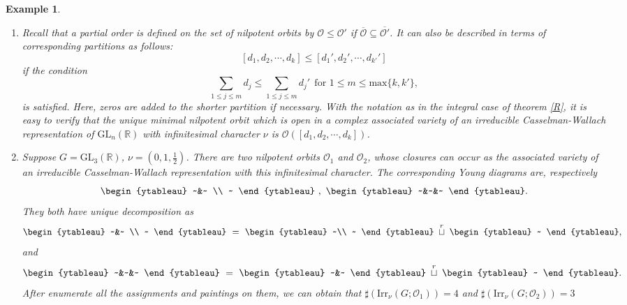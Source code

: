 \documentclass[12pt, a4paper]{amsart}
\numberwithin{equation}{section}
\newtheorem{examp}[thm]{Example}
\newcommand{\BR}{{\mathbb {R}}}
\newcommand{\CO}{{\mathcal {O}}}
\newcommand{\GL}{{\mathrm{GL}}}
\newcommand{\Irr}{{\mathrm{Irr}}}
\renewcommand{\bar}{\overline}
\begin{document}
\begin{examp}
    \begin{enumerate}
        \item Recall that a partial order is defined on the set of nilpotent orbits by $\CO \leq \CO'$ if $\bar{\CO} \subseteq \bar{\CO'}$. It can also be described in terms of corresponding partitions as follows: 
        \[
            [d_1, d_2, \cdots , d_k] \leq [d_1', d_2', \cdots , d_{k'}']
        \]
        if the condition
        \[
            \sum_{1 \leq j \leq m} d_{j} \leq \sum_{1 \leq j \leq m} d_{j}' \  \ \textrm{for $1 \leq m \leq \mathrm{max}\{k,k'\}$},
        \]
        is satisfied. Here, zeros are added to the shorter partition if necessary.
        With the notation as in the integral case of theorem \ref{R}, it is easy to verify that the unique minimal nilpotent orbit which is open in a complex associated variety of an irreducible Casselman-Wallach representation of $\GL_n(\BR)$ with infinitesimal character $\nu$ is $\CO([d_1, d_2, \cdots, d_k])$.
        \item Suppose $G = \GL_3(\BR)$, $\nu = (0,1,\frac{1}{2})$. There are two nilpotent orbits $\CO_1$ and $\CO_2$, whose closures can occur as the associated variety of an irreducible Casselman-Wallach representation with this infinitesimal character. The corresponding Young diagrams are, respectively
        \[
                \begin{ytableau}
                    ~&~ \\
                    ~
                \end{ytableau}
                ~,~
                \begin{ytableau}
                    ~&~&~
                \end{ytableau}.
        \]
        They both have unique decomposition as
        \[
        \begin{ytableau}
            ~&~ \\
            ~
        \end{ytableau}
        ~=~
        \begin{ytableau}
            ~\\
            ~
        \end{ytableau}
        ~\mathop{\sqcup}\limits^r~
        \begin{ytableau}
            ~
        \end{ytableau},
        \]
        and
        \[
        \begin{ytableau}
            ~&~&~
        \end{ytableau}
        ~=~
        \begin{ytableau}
            ~&~
        \end{ytableau}
        ~\mathop{\sqcup}\limits^r~
        \begin{ytableau}
            ~
        \end{ytableau}.
        \]
        After enumerate all the assignments and paintings on them, we can obtain that $\sharp(\Irr_{\nu}(G;\CO_1)) = 4$ and $\sharp(\Irr_{\nu}(G;\CO_2)) = 3$
    \end{enumerate}
\end{examp}
\end{document}
